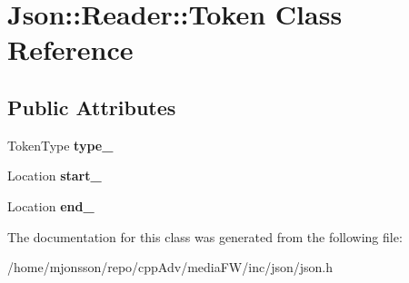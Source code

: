 \hypertarget{classJson_1_1Reader_1_1Token}{}\section{Json\+:\+:Reader\+:\+:Token Class Reference}
\label{classJson_1_1Reader_1_1Token}
\subsection*{Public Attributes}
\begin{DoxyCompactItemize}
\item 
\mbox{\label{classJson_1_1Reader_1_1Token_aa0f06d0105ec3d8cb42427c66b991bad}} 
Token\+Type {\bfseries type\+\_\+}
\item 
\mbox{\label{classJson_1_1Reader_1_1Token_aff87d677b9ac4b52542a00b0d6673249}} 
Location {\bfseries start\+\_\+}
\item 
\mbox{\label{classJson_1_1Reader_1_1Token_a7d3bc0fa40097f435d184be4b1fd5ae1}} 
Location {\bfseries end\+\_\+}
\end{DoxyCompactItemize}


The documentation for this class was generated from the following file\+:\begin{DoxyCompactItemize}
\item 
/home/mjonsson/repo/cpp\+Adv/media\+F\+W/inc/json/json.\+h\end{DoxyCompactItemize}
